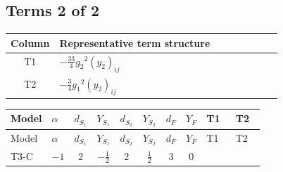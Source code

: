 \documentclass[8pt]{article}
\begin{document}
\begin{landscape}
\subsection*{Terms 2 of 2}
\begin{center}
\begin{tabular}{@{}c >{\raggedright\arraybackslash}p{0.82\linewidth}@{}}
\toprule
Column & Representative term structure \\
\midrule
T1 & \(\displaystyle -\frac{33}{4} {g_2}^2 \left({y_2}\right)_{ij}\) \\
\midrule
T2 & \(\displaystyle -\frac{3}{4} {g_1}^2 \left({y_2}\right)_{ij}\) \\
\midrule
\bottomrule
\end{tabular}
\end{center}
\smallskip
\tiny
\begin{longtable}{@{}llcccccc >{\raggedright\arraybackslash}p{0.21\linewidth} >{\raggedright\arraybackslash}p{0.21\linewidth}@{}}
\toprule
Model & $\alpha$ & $d_{S_1}$ & $Y_{S_1}$ & $d_{S_2}$ & $Y_{S_2}$ & $d_F$ & $Y_F$ & T1 & T2 \\
\midrule
\endfirsthead
\toprule
Model & $\alpha$ & $d_{S_1}$ & $Y_{S_1}$ & $d_{S_2}$ & $Y_{S_2}$ & $d_F$ & $Y_F$ & T1 & T2 \\
\midrule
\endhead
T3-C & $-1$ & $2$ & $-\frac{1}{2}$ & $2$ & $\frac{1}{2}$ & $3$ & $0$ & \scriptsize\adjustbox{max width=\linewidth}{$\begin{gathered} -\frac{33}{4} {g_2}^2 \left({y_2}\right)_{ij}\end{gathered}$} & \scriptsize\adjustbox{max width=\linewidth}{$\begin{gathered} -\frac{3}{4} {g_1}^2 \left({y_2}\right)_{ij}\end{gathered}$} \\
\midrule
\bottomrule
\end{longtable}
\clearpage

\end{landscape}
\end{document}
